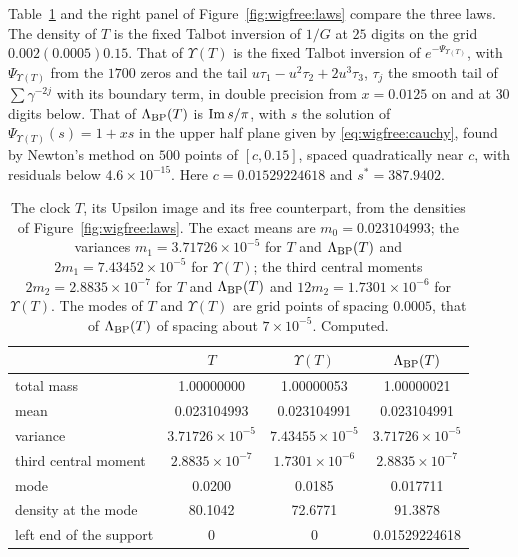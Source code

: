 Table~\ref{tab:wigfree:laws} and the right panel of Figure~\ref{fig:wigfree:laws} compare the three laws. The density of $T$ is the fixed Talbot inversion of $1/G$ at $25$ digits on the grid $0.002(0.0005)0.15$. That of $\Upsilon(T)$ is the fixed Talbot inversion of $e^{-\Psi_{\Upsilon(T)}}$, with $\Psi_{\Upsilon(T)}$ from the $1700$ zeros and the tail $u\tau_1-u^2\tau_2+2u^3\tau_3$, $\tau_j$ the smooth tail of $\sum\gamma^{-2j}$ with its boundary term, in double precision from $x=0.0125$ on and at $30$ digits below. That of $\Lambda_{\rm BP}(T)$ is $\operatorname{Im} s/\pi$, with $s$ the solution of $\Psi_{\Upsilon(T)}(s)=1+xs$ in the upper half plane given by \eqref{eq:wigfree:cauchy}, found by Newton's method on $500$ points of $[c,0.15]$, spaced quadratically near $c$, with residuals below $4.6\times10^{-15}$. Here $c=0.01529224618$ and $s^*=387.9402$.

\begin{table}[htbp]
\centering\footnotesize
\setlength{\tabcolsep}{4pt}
\begin{tabular}{lccc}
\toprule
 & $T$ & $\Upsilon(T)$ & $\Lambda_{\rm BP}(T)$\\
\midrule
total mass & 1.00000000 & 1.00000053 & 1.00000021\\
mean & 0.023104993 & 0.023104991 & 0.023104991\\
variance & $3.71726\times10^{-5}$ & $7.43455\times10^{-5}$ & $3.71726\times10^{-5}$\\
third central moment & $2.8835\times10^{-7}$ & $1.7301\times10^{-6}$ & $2.8835\times10^{-7}$\\
mode & 0.0200 & 0.0185 & 0.017711\\
density at the mode & 80.1042 & 72.6771 & 91.3878\\
left end of the support & 0 & 0 & 0.01529224618\\
\bottomrule
\end{tabular}
\caption{The clock $T$, its Upsilon image and its free counterpart, from the densities of Figure~\ref{fig:wigfree:laws}. The exact means are $m_0=0.023104993$; the variances $m_1=3.71726\times10^{-5}$ for $T$ and $\Lambda_{\rm BP}(T)$ and $2m_1=7.43452\times10^{-5}$ for $\Upsilon(T)$; the third central moments $2m_2=2.8835\times10^{-7}$ for $T$ and $\Lambda_{\rm BP}(T)$ and $12m_2=1.7301\times10^{-6}$ for $\Upsilon(T)$. The modes of $T$ and $\Upsilon(T)$ are grid points of spacing $0.0005$, that of $\Lambda_{\rm BP}(T)$ of spacing about $7\times10^{-5}$. Computed.}
\label{tab:wigfree:laws}
\end{table}

